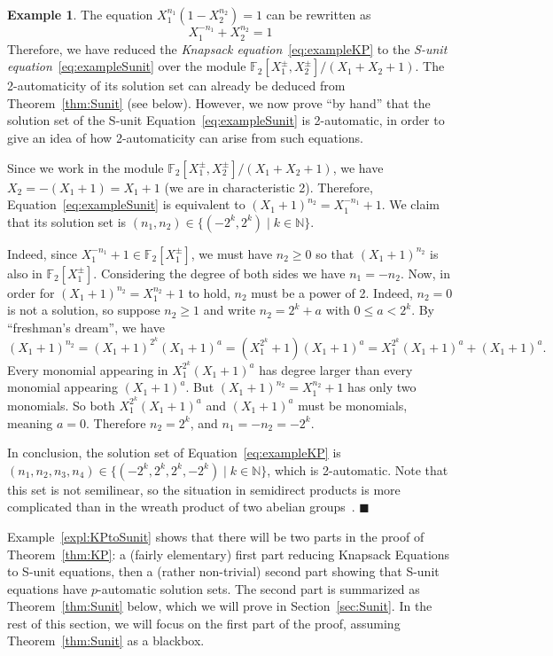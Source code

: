 \documentclass[a4paper,UKenglish,cleveref, autoref, thm-restate]{lipics-v2021}
\newcommand{\N}{\mathbb{N}}
\newcommand{\F}{\mathbb{F}}
\theoremstyle{definition}
\theoremstyle{definition}
\newtheorem{exmpl}[thrm]{Example}
\theoremstyle{definition}
\begin{document}
\begin{exmpl}
    The equation $X_1^{n_1} (1 - X_2^{n_2}) = 1$ can be rewritten as 
    \begin{equation}\label{eq:exampleSunit}
        X_1^{- n_1} + X_2^{n_2} = 1
    \end{equation}
    Therefore, we have reduced the \emph{Knapsack equation}~\eqref{eq:exampleKP} to the \emph{S-unit equation}~\eqref{eq:exampleSunit} over the module $\F_2[X_1^{\pm}, X_2^{\pm}]/(X_1+X_2+1)$.
    The 2-automaticity of its solution set can already be deduced from Theorem~\ref{thm:Sunit} (see below).
    However, we now prove ``by hand'' that the solution set of the S-unit Equation~\eqref{eq:exampleSunit} is 2-automatic, in order to give an idea of how 2-automaticity can arise from such equations.

    Since we work in the module $\F_2[X_1^{\pm}, X_2^{\pm}]/(X_1+X_2+1)$, we have $X_2 = - (X_1 + 1) = X_1 + 1$ (we are in characteristic 2).
    Therefore, Equation~\eqref{eq:exampleSunit} is equivalent to $(X_1 + 1)^{n_2} = X_1^{- n_1} + 1$.
    We claim that its solution set is $(n_1, n_2) \in \{(-2^k, 2^k) \mid k \in \N\}$.
    
    Indeed, since $X_1^{- n_1} + 1 \in \F_2[X_1^{\pm}]$, we must have $n_2 \geq 0$ so that $(X_1 + 1)^{n_2}$ is also in $\F_2[X_1^{\pm}]$. Considering the degree of both sides we have $n_1 = -n_2$. Now, in order for $(X_1 + 1)^{n_2} = X_1^{n_2} + 1$ to hold, $n_2$ must be a power of 2. 
    Indeed, $n_2 = 0$ is not a solution, so suppose $n_2 \geq 1$ and write $n_2 = 2^k + a$ with $0 \leq a < 2^k$.
    By ``freshman's dream'', we have
    \[
    (X_1 + 1)^{n_2} = (X_1 + 1)^{2^k} (X_1 + 1)^a = (X_1^{2^k} + 1) (X_1 + 1)^a = X_1^{2^k} (X_1 + 1)^a + (X_1 + 1)^a.
    \]
    Every monomial appearing in $X_1^{2^k} (X_1 + 1)^a$ has degree larger than every monomial appearing $(X_1 + 1)^a$. But $(X_1 + 1)^{n_2} = X_1^{n_2} + 1$ has only two monomials.
    So both $X_1^{2^k} (X_1 + 1)^a$ and $(X_1 + 1)^a$ must be monomials, meaning $a = 0$.
    Therefore $n_2 = 2^k$, and $n_1 = - n_2 = - 2^k$.

    In conclusion, the solution set of Equation~\eqref{eq:exampleKP} is $(n_1, n_2, n_3, n_4) \in \{(-2^k, 2^k, 2^k, - 2^k) \mid k \in \N\}$, which is 2-automatic. 
    Note that this set is not semilinear, so the situation in semidirect products is more complicated than in the wreath product of two abelian groups~\cite{DBLP:conf/stacs/GanardiKLZ18}.
    \hfill $\blacksquare$
\end{exmpl}

Example~\ref{expl:KPtoSunit} shows that there will be two parts in the proof of Theorem~\ref{thm:KP}: a (fairly elementary) first part reducing Knapsack Equations to S-unit equations, then a (rather non-trivial) second part showing that S-unit equations have $p$-automatic solution sets.
The second part is summarized as Theorem~\ref{thm:Sunit} below, which we will prove in Section~\ref{sec:Sunit}. In the rest of this section, we will focus on the first part of the proof, assuming Theorem~\ref{thm:Sunit} as a blackbox.
\end{document}
